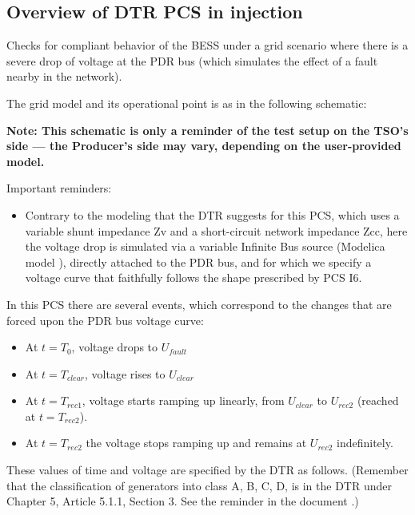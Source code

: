     \subsection{Overview of DTR PCS \DTRPcs in injection}

    Checks for compliant behavior of the BESS under a grid scenario where there is a
    severe drop of voltage at the PDR bus (which simulates the effect of a fault
    nearby in the network).

    The grid model and its operational point is as in the following schematic:
    \begin{center}
        
    \end{center}
    \begin{center}
        \small \textbf{Note: This schematic is only a reminder of the test setup on the TSO's
        side --- the Producer's side may vary, depending on the user-provided model.}
    \end{center}

    \noindent Important reminders:
    \begin{itemize}
        \item Contrary to the modeling that the DTR suggests for this PCS, which uses a
        variable shunt impedance Zv and a short-circuit network impedance Zcc, here
        the voltage drop is simulated via a variable Infinite Bus source (Modelica
        model ), directly attached to the PDR bus, and for
        which we specify a voltage curve that faithfully follows the shape prescribed
        by PCS I6.
    \end{itemize}

    In this PCS there are several events, which correspond to the changes that are
    forced upon the PDR bus voltage curve:
    \begin{itemize}
        \item At $t = T_{0}$, voltage drops to $U_{fault}$
        \item At $t = T_{clear}$, voltage rises to $U_{clear}$
        \item At $t = T_{rec1}$, voltage starts ramping up linearly, from $U_{clear}$ to
        $U_{rec2}$ (reached at $t = T_{rec2}$).
        \item At $t = T_{rec2}$ the voltage stops ramping up and remains at $U_{rec2}$
        indefinitely.
    \end{itemize}
    These values of time and voltage are specified by the DTR as follows. (Remember
    that the classification of generators into class A, B, C, D, is in the DTR under
    Chapter 5, Article 5.1.1, Section 3. See the reminder in the document
    .)


